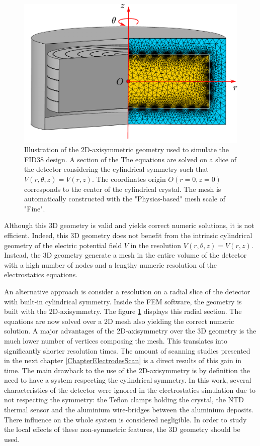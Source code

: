 \begin{figure}
\centering
\includegraphics[scale=0.7]{Figures/Electrodes/mesh_3d.pdf}
\caption{Illustration of the 2D-axisymmetric geometry used to simulate the FID38 design. A section of the  The equations are solved on a slice of the detector considering the cylindrical symmetry such that $V(r, \theta, z) = V(r,z)$. The coordinates origin $O(r=0, z=0)$ corresponds to the center of the cylindrical crystal. The mesh is automatically constructed with the "Physics-based" mesh scale of "Fine".}
\label{fig:space-dimension-geometry}
\end{figure}

Although this 3D geometry is valid and yields correct numeric solutions, it is not efficient. Indeed, this 3D geometry does not benefit from the intrinsic cylindrical geometry of the electric potential field $V$ in the resolution $V(r, \theta, z) = V(r,z)$. Instead, the 3D geometry generate a mesh in the entire volume of the detector with a high number of nodes and a lengthy numeric resolution of the electrostatics equations.

An alternative approach is consider a resolution on a radial slice of the detector with built-in cylindrical symmetry. Inside the FEM software, the geometry is built with the 2D-axisymmetry. The figure \ref{fig:space-dimension-geometry} displays this radial section. The equations are now solved over a 2D mesh also yielding the correct numeric solution. A major advantages of the 2D-axisymmetry over the 3D geometry is the much lower number of vertices composing the mesh. This translates into significantly shorter resolution times. The amount of scanning studies presented in the next chapter \ref{ChapterElectrodesScan} is a direct results of this gain in time. The main drawback to the use of the 2D-axisymmetry is by definition the need to have a system respecting the cylindrical symmetry. In this work, several characteristics of the detector were ignored in the electrostatics simulation due to not respecting the symmetry: the Teflon clamps holding the crystal, the NTD thermal sensor and the aluminium wire-bridges between the aluminium deposits. There influence on the whole system is considered negligible. In order to study the local effects of these non-symmetric features, the 3D geometry should be used.


